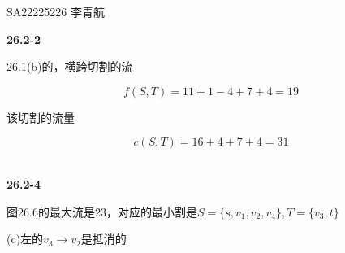 \documentclass[UTF8]{ctexart}
\begin{document}
    SA22225226 李青航

    \noindent\textbf{26.2-2}

    26.1(b)的，横跨切割的流

    $$f(S,T)=11+1-4+7+4=19$$

    该切割的流量

    $$c(S,T)=16+4+7+4=31$$

    ~\\
    \noindent\textbf{26.2-4}

    图26.6的最大流是23，对应的最小割是$S=\{s,v_1,v_2,v_4\},T=\{v_3,t\}$

    (c)左的$v_3\rightarrow v_2$是抵消的
\end{document}
